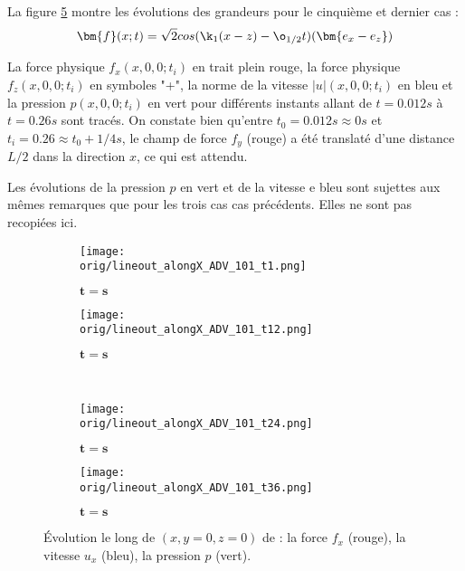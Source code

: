 La figure \ref{fig : 101_alongX} montre les évolutions des grandeurs pour le cinquième et dernier cas :
\begin{align}
&\bm{f}(x;t)  = \sqrt{2} cos(\k_1 (x-z) - \o_{1/2} t) (\bm{e_x - e_z}) \\
\end{align} 

La force physique $f_x(x,0,0;t_i)$ en trait plein rouge, la force physique $f_z(x,0,0;t_i)$ en symboles "+", la norme de la vitesse $|u|(x,0,0;t_i)$ en bleu et la pression $p(x,0,0;t_i)$ en vert pour différents instants allant de $t=0.012s$ à $t=0.26s$ sont tracés. On constate bien qu'entre $t_0=0.012s \approx 0s$ et $t_i = 0.26 \approx t_0 + 1/4 s$, le champ de force $f_y$ (rouge) a été translaté d'une distance $L/2$ dans la direction $x$, ce qui est attendu. 

Les évolutions de la pression $p$ en vert et de la vitesse e bleu sont sujettes aux mêmes remarques que pour les trois cas cas précédents. Elles ne sont pas recopiées ici.


\begin{figure}
\begin{center}
	\begin{subfigure}[t]{0.4\textwidth}                                                                                                                                   
		\texttt{[image: \\orig/lineout\_alongX\_ADV\_101\_t1.png]}
		\caption{ $\bm{t=s}$}
		\label{fig : 101_t1}
	\end{subfigure}\hfill
	\begin{subfigure}[t]{0.4\textwidth}
		\texttt{[image: \\orig/lineout\_alongX\_ADV\_101\_t12.png]}
		\caption{ $\bm{t=s}$}
		\label{fig : 101_t6}
	\end{subfigure}
\\
	\begin{subfigure}[t]{0.4\textwidth}
		\texttt{[image: \\orig/lineout\_alongX\_ADV\_101\_t24.png]}
		\caption{ $\bm{t=s}$}
		\label{fig : 101_t11}
	\end{subfigure}\hfill
	\begin{subfigure}[t]{0.4\textwidth}
		\texttt{[image: \\orig/lineout\_alongX\_ADV\_101\_t36.png]}
		\caption{ $\bm{t=s}$}
		\label{fig : 101_t16}
	\end{subfigure}
\end{center}
\caption{Évolution le long de $(x,y=0,z=0)$ de : la force $f_x$ (rouge), la vitesse $u_x$ (bleu), la pression $p$ (vert).}
\label{fig : 101_alongX}
\end{figure}


